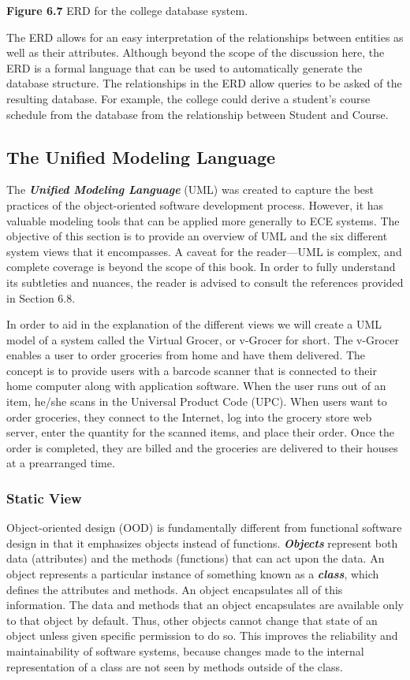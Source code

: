 \textbf{Figure 6.7} ERD for the college database system.

The ERD allows for an easy interpretation of the relationships between
entities as well as their attributes. Although beyond the scope of the
discussion here, the ERD is a formal language that can be used to
automatically generate the database structure. The relationships in the
ERD allow queries to be asked of the resulting database. For example,
the college could derive a student's course schedule from the database
from the relationship between Student and Course.

\subsection{The Unified Modeling
Language}\label{the-unified-modeling-language}

The \emph{\textbf{Unified Modeling Language}} (UML) was created to
capture the best practices of the object-oriented software development
process. However, it has valuable modeling tools that can be applied
more generally to ECE systems. The objective of this section is to
provide an overview of UML and the six different system views that it
encompasses. A caveat for the reader---UML is complex, and complete
coverage is beyond the scope of this book. In order to fully understand
its subtleties and nuances, the reader is advised to consult the
references provided in Section 6.8.

In order to aid in the explanation of the different views we will create
a UML model of a system called the Virtual Grocer, or v-Grocer for
short. The v-Grocer enables a user to order groceries from home and have
them delivered. The concept is to provide users with a barcode scanner
that is connected to their home computer along with application
software. When the user runs out of an item, he/she scans in the
Universal Product Code (UPC). When users want to order groceries, they
connect to the Internet, log into the grocery store web server, enter
the quantity for the scanned items, and place their order. Once the
order is completed, they are billed and the groceries are delivered to
their houses at a prearranged time.

\subsubsection{Static View}\label{static-view}

Object-oriented design (OOD) is fundamentally different from functional
software design in that it emphasizes objects instead of functions.
\emph{\textbf{Objects}} represent both data (attributes) and the methods
(functions) that can act upon the data. An object represents a
particular instance of something known as a \emph{\textbf{class}}, which
defines the attributes and methods. An object encapsulates all of this
information. The data and methods that an object encapsulates are
available only to that object by default. Thus, other objects cannot
change that state of an object unless given specific permission to do
so. This improves the reliability and maintainability of software
systems, because changes made to the internal representation of a class
are not seen by methods outside of the class.

